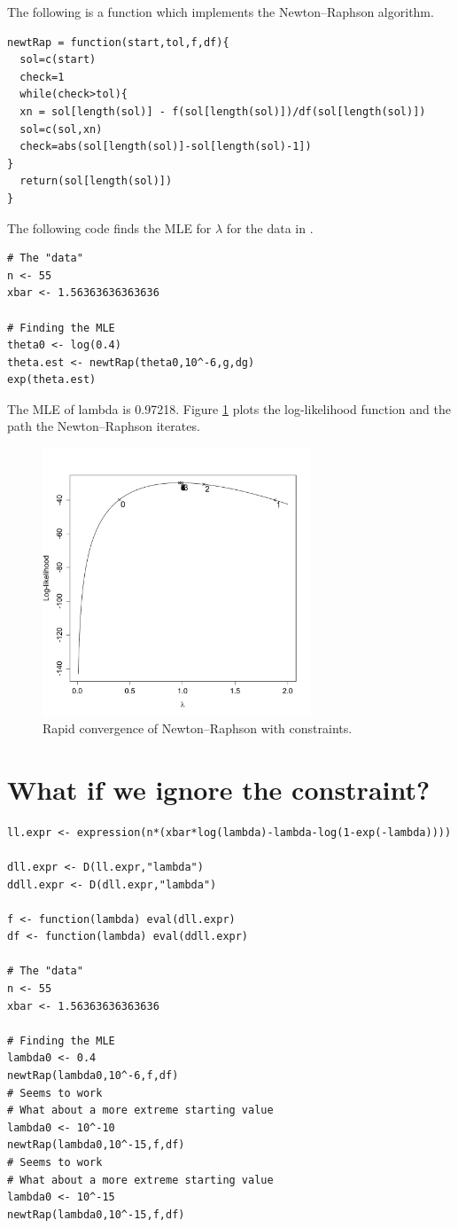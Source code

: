 \documentclass[a4paper,10pt]{article}
\begin{document}
The following is a function which implements the Newton--Raphson algorithm.
\begin{Verbatim}[frame=lines]
newtRap = function(start,tol,f,df){
  sol=c(start)
  check=1
  while(check>tol){ 
  xn = sol[length(sol)] - f(sol[length(sol)])/df(sol[length(sol)]) 
  sol=c(sol,xn) 
  check=abs(sol[length(sol)]-sol[length(sol)-1])
}
  return(sol[length(sol)]) 
}
\end{Verbatim}

The following code finds the MLE for $\lambda$ for the data in \citet{meng1997em}.
\begin{Verbatim}[frame=lines]
# The "data"
n <- 55
xbar <- 1.56363636363636

# Finding the MLE
theta0 <- log(0.4)
theta.est <- newtRap(theta0,10^-6,g,dg)
exp(theta.est)
\end{Verbatim}
The MLE of lambda is 0.97218. 
Figure \ref{fig:1} plots the log-likelihood function and the path the Newton--Raphson iterates.
\begin{figure} 
\centering
\includegraphics[width=8cm]{NewtonR_meng.pdf}
\caption{Rapid convergence of Newton--Raphson with constraints.}
\label{fig:1}
\end{figure}

 
 \newpage
\section{What if we ignore the constraint?}


\begin{Verbatim}[frame=lines]
ll.expr <- expression(n*(xbar*log(lambda)-lambda-log(1-exp(-lambda))))

dll.expr <- D(ll.expr,"lambda")
ddll.expr <- D(dll.expr,"lambda")

f <- function(lambda) eval(dll.expr) 
df <- function(lambda) eval(ddll.expr) 

# The "data"
n <- 55
xbar <- 1.56363636363636

# Finding the MLE
lambda0 <- 0.4
newtRap(lambda0,10^-6,f,df)
# Seems to work
# What about a more extreme starting value
lambda0 <- 10^-10
newtRap(lambda0,10^-15,f,df)
# Seems to work
# What about a more extreme starting value
lambda0 <- 10^-15
newtRap(lambda0,10^-15,f,df)
\end{Verbatim}







\end{document}
